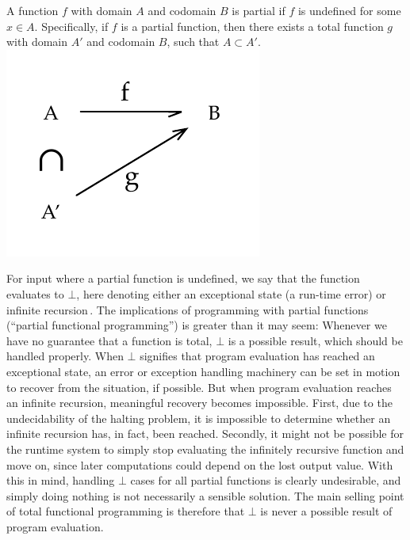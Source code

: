 \begin{definition}
  A function $f$ with domain $A$ and codomain $B$ is partial if $f$ is undefined
  for some $x\in A$. Specifically, if $f$ is a partial function, then there
  exists a total function $g$ with domain $A'$ and codomain $B$, such that
  $A\subset A'$.
  \centering
  \includegraphics[scale=0.8]{figures/partialfunc}
\end{definition}

For input  where a partial function is undefined, we say that
the function evaluates to $\bot$, here denoting either an exceptional state (a
run-time error) or infinite recursion\,\citep{Turner04totalfunctional}. The
implications of programming with partial functions (``partial functional
programming'') is greater than it may seem: Whenever we have no guarantee that a
function is total, $\bot$ is a possible result, which should be handled
properly. When $\bot$ signifies that program evaluation has reached an
exceptional state, an error or exception handling machinery can be set in motion
to recover from the situation, if possible. But when program evaluation reaches
an infinite recursion, meaningful recovery becomes impossible. First, due to the
undecidability of the halting problem, it is impossible to determine whether an
infinite recursion has, in fact, been reached. Secondly, it might not be
possible for the runtime system to simply stop evaluating the infinitely
recursive function and move on, since later computations could depend on the lost
output value. With this in mind, handling $\bot$ cases for all partial functions
is clearly undesirable, and simply doing nothing is not necessarily a sensible
solution. The main selling point of total functional programming is therefore
that $\bot$ is never a possible result of program evaluation.

